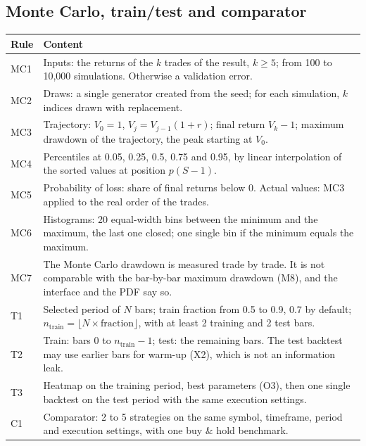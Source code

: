 \documentclass[11pt,a4paper]{article}
\begin{document}
\subsection*{Monte Carlo, train/test and comparator}
\begin{longtable}{@{}p{0.9cm}p{14.8cm}@{}}
\toprule
\textbf{Rule} & \textbf{Content} \\
\midrule
\endhead
MC1 & Inputs: the returns of the $k$ trades of the result, $k \geq 5$; from 100 to 10,000 simulations. Otherwise a validation error. \\
MC2 & Draws: a single generator created from the seed; for each simulation, $k$ indices drawn with replacement. \\
MC3 & Trajectory: $V_0 = 1$, $V_j = V_{j-1}(1 + r)$; final return $V_k - 1$; maximum drawdown of the trajectory, the peak starting at $V_0$. \\
MC4 & Percentiles at 0.05, 0.25, 0.5, 0.75 and 0.95, by linear interpolation of the sorted values at position $p(S-1)$. \\
MC5 & Probability of loss: share of final returns below 0. Actual values: MC3 applied to the real order of the trades. \\
MC6 & Histograms: 20 equal-width bins between the minimum and the maximum, the last one closed; one single bin if the minimum equals the maximum. \\
MC7 & The Monte Carlo drawdown is measured trade by trade. It is not comparable with the bar-by-bar maximum drawdown (M8), and the interface and the PDF say so. \\
T1 & Selected period of $N$ bars; train fraction from 0.5 to 0.9, 0.7 by default; $n_{\text{train}} = \lfloor N \times \text{fraction} \rfloor$, with at least 2 training and 2 test bars. \\
T2 & Train: bars $0$ to $n_{\text{train}}-1$; test: the remaining bars. The test backtest may use earlier bars for warm-up (X2), which is not an information leak. \\
T3 & Heatmap on the training period, best parameters (O3), then one single backtest on the test period with the same execution settings. \\
C1 & Comparator: 2 to 5 strategies on the same symbol, timeframe, period and execution settings, with one buy \& hold benchmark. \\
\bottomrule
\end{longtable}
\normalsize
\end{document}
